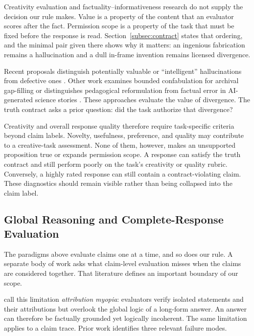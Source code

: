 \documentclass{clv2025}
\begin{document}
Creativity evaluation and factuality--informativeness research do not supply
the decision our rule makes.
Value is a property of the content that an evaluator scores after the fact.
Permission scope is a property of the task that must be fixed before the
response is read.
Section~\ref{subsec:contract} states that ordering, and the minimal pair given
there shows why it matters: an ingenious fabrication remains a hallucination
and a dull in-frame invention remains licensed divergence.

Recent proposals distinguish potentially valuable or ``intelligent''
hallucinations from defective ones
\citep{jiang_survey_2024,sui_confabulation_2024,yang_hicbench_2025}.
Other work examines bounded confabulation for archival gap-filling
\citep{sui_critical_2025} or distinguishes pedagogical reformulation from
factual error in AI-generated science stories
\citep{argese_storyscore_2026}.
These approaches evaluate the value of divergence.
The truth contract asks a prior question: did the task authorize that
divergence?

Creativity and overall response quality therefore require task-specific
criteria beyond claim labels.
Novelty, usefulness, preference, and quality may contribute to a creative-task
assessment. None of them, however, makes an unsupported proposition true or
expands permission scope.
A response can satisfy the truth contract and still perform poorly on the
task's creativity or quality rubric. Conversely, a highly rated response can
still contain a contract-violating claim.
These diagnostics should remain visible rather than being collapsed into the
claim label.

\subsection{Global Reasoning and Complete-Response Evaluation}\label{subsec:global}

The paradigms above evaluate claims one at a time, and so does our rule.
A separate body of work asks what claim-level evaluation misses when the claims
are considered together. That literature defines an important boundary of our
scope.

\citet{yan_logicscore_2026} call this limitation \emph{attribution myopia}:
evaluators verify isolated statements and their attributions but overlook the
global logic of a long-form answer. An answer can therefore be factually
grounded yet logically incoherent.
The same limitation applies to a claim trace. Prior work identifies three
relevant failure modes.
\end{document}
